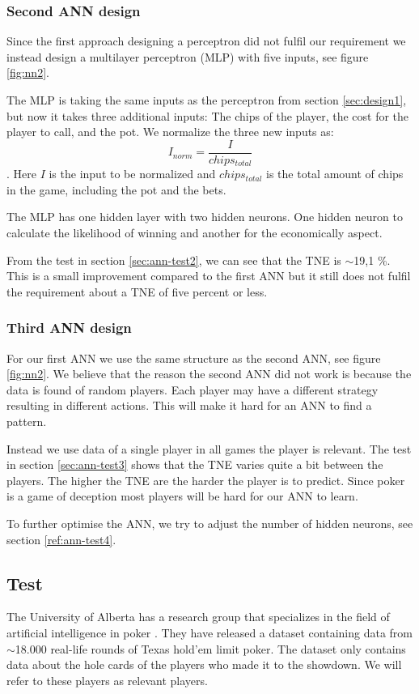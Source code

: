 \subsubsection{Second ANN design}
\label{sec:design2}
Since the first approach designing a perceptron did not fulfil our requirement we instead design a multilayer perceptron (MLP) with five inputs, see figure \ref{fig:nn2}.

The MLP is taking the same inputs as the perceptron from section \ref{sec:design1}, but now it takes three additional inputs: The chips of the player, the cost for the player to call, and the pot. We normalize the three new inputs as: \[I_{norm} = \frac{I}{chips_{total}}\]. 
Here $I$ is the input to be normalized and $chips_{total}$ is the total amount of chips in the game, including the pot and the bets.

The MLP has one hidden layer with two hidden neurons. One hidden neuron to calculate the likelihood of winning and another for the economically aspect.



From the test in section \ref{sec:ann-test2}, we can see that the TNE is $\sim$19,1 \%. This is a small improvement compared to the first ANN but it still does not fulfil the requirement about a TNE of five percent or less.

\subsubsection{Third ANN design}
\label{sec:design3}
For our first ANN we use the same structure as the second ANN, see figure \ref{fig:nn2}. We believe that the reason the second ANN did not work is because the data is found of random players. Each player may have a different strategy resulting in different actions. This will make it hard for an ANN to find a pattern. 

Instead we use data of a single player in all games the player is relevant. The test in section \ref{sec:ann-test3} shows that the TNE varies quite a bit between the players. The higher the TNE are the harder the player is to predict. Since poker is a game of deception most players will be hard for our ANN to learn.

To further optimise the ANN, we try to adjust the number of hidden neurons, see section \ref{ref:ann-test4}.

\subsection{Test}
\label{sec:default-test}
The University of Alberta has a research group that specializes in the field of artificial intelligence in poker \cite{alberta}. They have released a dataset containing data from $\sim$18.000 real-life rounds of Texas hold'em limit poker. The dataset only contains data about the hole cards of the players who made it to the showdown. We will refer to these players as relevant players.


